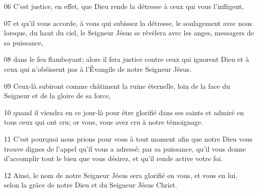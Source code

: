 
06 C’est justice, en effet, que Dieu rende la détresse à ceux qui vous l’infligent,

07 et qu’il vous accorde, à vous qui subissez la détresse, le soulagement avec nous lorsque, du haut du ciel, le Seigneur Jésus se révélera avec les anges, messagers de sa puissance,

08 dans le feu flamboyant; alors il fera justice contre ceux qui ignorent Dieu et à ceux qui n’obéissent pas à l’Évangile de notre Seigneur Jésus.

09 Ceux-là subiront comme châtiment la ruine éternelle, loin de la face du Seigneur et de la gloire de sa force,

10 quand il viendra en ce jour-là pour être glorifié dans ses saints et admiré en tous ceux qui ont cru; or vous, vous avez cru à notre témoignage.

11 C’est pourquoi nous prions pour vous à tout moment afin que notre Dieu vous trouve dignes de l’appel qu’il vous a adressé; par sa puissance, qu’il vous donne d’accomplir tout le bien que vous désirez, et qu’il rende active votre foi.

12 Ainsi, le nom de notre Seigneur Jésus sera glorifié en vous, et vous en lui, selon la grâce de notre Dieu et du Seigneur Jésus Christ.